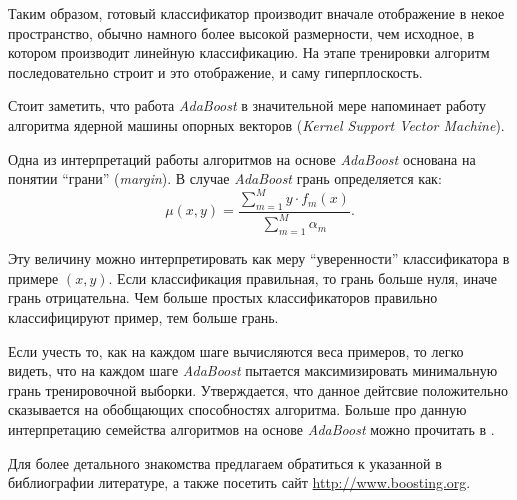 Таким образом, готовый классификатор производит вначале отображение в некое пространство, обычно намного более высокой размерности, чем исходное, в котором производит линейную классификацию. На этапе тренировки алгоритм последовательно строит и это отображение, и саму гиперплоскость.

Стоит заметить, что работа \emph{AdaBoost} в значительной мере напоминает работу алгоритма ядерной машины опорных векторов (\emph{Kernel Support Vector Machine}).

Одна из интерпретаций работы алгоритмов на основе \emph{AdaBoost} основана на понятии ``грани'' (\emph{margin}). В случае \emph{AdaBoost} грань определяется как:
\begin{displaymath}
  \mu(x, y) = \frac{\sum_{m = 1}^M{y \cdot f_m(x)}}{\sum_{m = 1}^M{\alpha_m}}.
\end{displaymath}

Эту величину можно интерпретировать как меру ``уверенности'' классификатора в примере $(x, y)$. Если классификация правильная, то грань больше нуля, иначе грань отрицательна. Чем больше простых классификаторов правильно классифицируют пример, тем больше грань.

Если учесть то, как на каждом шаге вычисляются веса примеров, то легко видеть, что на каждом шаге \emph{AdaBoost} пытается максимизировать минимальную грань тренировочной выборки. Утверждается, что данное дейтсвие положительно сказывается на обобщающих способностях алгоритма. Больше про данную интерпретацию семейства алгоритмов на основе \emph{AdaBoost} можно прочитать в \cite{rosset04}.

Для более детального знакомства предлагаем обратиться к указанной в библиографии литературе, а также посетить сайт \url{http://www.boosting.org}.

\newpage
